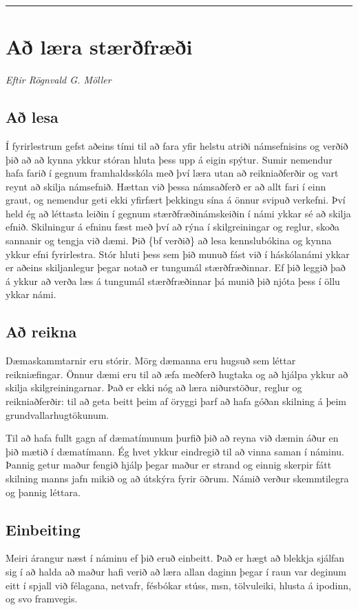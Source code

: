 \documentclass[a4paper,10pt,icelandic]{sphinxmanual}
\begin{document}
\bigskip\hrule{}\bigskip



\section{Að læra stærðfræði}
\label{vidauki:a-laera-staerfraei}
\emph{Eftir Rögnvald G. Möller}


\subsection{Að lesa}
\label{vidauki:a-lesa}
Í fyrirlestrum gefst aðeins
tími til að fara yfir helstu atriði námsefnisins og verðið þið að
að kynna ykkur stóran hluta þess upp á eigin spýtur. Sumir nemendur
hafa farið í gegnum framhaldsskóla með því
læra utan að reikniaðferðir og vart reynt að skilja námsefnið.  Hættan
við þessa námsaðferð er að allt fari
í einn graut, og
nemendur geti ekki yfirfært þekkingu sína á önnur svipuð verkefni.
Því held ég að léttasta leiðin í gegnum stærðfræðinámskeiðin í námi
ykkar sé að skilja efnið.  Skilningur á efninu fæst með því að rýna í
skilgreiningar og reglur, skoða sannanir og tengja við dæmi.
Þið \{bf verðið\} að lesa
kennslubókina og kynna ykkur efni fyrirlestra.
Stór hluti þess sem þið munuð fást við í
háskólanámi ykkar er aðeins skiljanlegur þegar notað er tungumál
stærðfræðinnar.  Ef þið leggið það á ykkur að verða læs á tungumál
stærðfræðinnar þá munið þið njóta þess í öllu ykkar námi.


\subsection{Að reikna}
\label{vidauki:a-reikna}
Dæmaskammtarnir eru stórir.  Mörg dæmanna eru hugsuð
sem léttar reikniæfingar.
Önnur dæmi eru til að æfa
meðferð hugtaka og að hjálpa ykkur að skilja
skilgreiningarnar.  Það er ekki nóg að læra niðurstöður, reglur og
reikniaðferðir: til að geta beitt þeim af öryggi þarf að hafa góðan
skilning á þeim grundvallarhugtökunum.

Til að hafa fullt gagn af dæmatímunum þurfið þið að reyna við dæmin
áður en þið mætið í dæmatímann.
Ég hvet ykkur eindregið til að vinna saman í náminu.  Þannig getur
maður fengið hjálp þegar maður er strand og
einnig skerpir fátt skilning manns  jafn mikið og að útskýra
fyrir öðrum.  Námið verður  skemmtilegra og þannig
léttara.


\subsection{Einbeiting}
\label{vidauki:einbeiting}
Meiri árangur næst í náminu ef þið eruð einbeitt.
Það er hægt að blekkja sjálfan sig í að halda að maður hafi verið að
læra allan daginn þegar í raun var deginum eitt í spjall við félagana,
netvafr, fésbókar stúss, msn, tölvuleiki, hlusta á ipodinn, og
svo framvegis.
\end{document}
